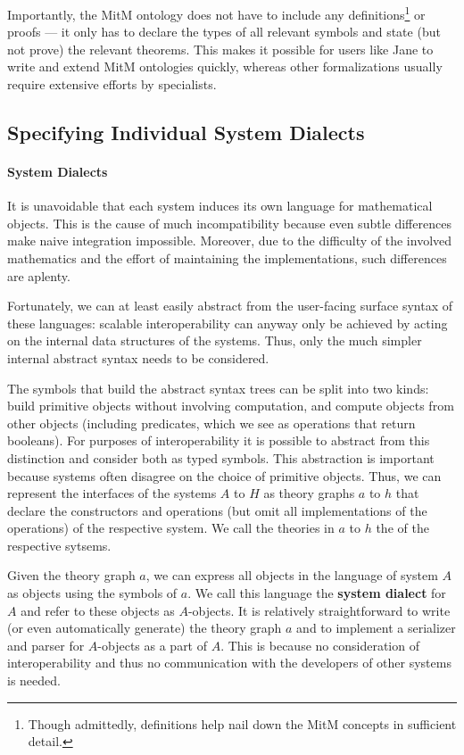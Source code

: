 Importantly, the MitM ontology does not have to include any definitions\footnote{Though admittedly, definitions help nail down the MitM concepts in sufficient detail. } or proofs --- it only has to declare the types of all relevant symbols and state (but not prove) the relevant theorems.
This makes it possible for users like Jane to write and extend MitM ontologies quickly, whereas other formalizations usually require extensive efforts by specialists.

\subsection{Specifying Individual System Dialects}\label{sec:mitm:dialect}

\paragraph{System Dialects}
It is unavoidable that each system induces its own language for mathematical objects.
This is the cause of much incompatibility because even subtle differences make naive integration impossible.
Moreover, due to the difficulty of the involved mathematics and the effort of maintaining the implementations, such differences are aplenty.

Fortunately, we can at least easily abstract from the user-facing surface syntax of these languages:
scalable interoperability can anyway only be achieved by acting on the internal data structures of the systems.
Thus, only the much simpler internal abstract syntax needs to be considered.

The symbols that build the abstract syntax trees can be split into two kinds:  build primitive objects without involving computation, and 
compute objects from other objects (including predicates, which we see as operations that return booleans).
For purposes of interoperability it is possible to abstract from this distinction and consider both as typed symbols.
This abstraction is important because systems often disagree on the choice of primitive objects.
Thus, we can represent the interfaces of the systems $A$ to $H$ as \OMMT theory graphs $a$ to $h$ that declare the constructors and operations (but omit all implementations of the operations) of the respective system.
We call the theories in $a$ to $h$ the  of the respective sytsems. 

Given the theory graph $a$, we can express all objects in the language of system $A$ as \OMMT objects using the symbols of $a$.
We call this language the \textbf{\OMMT system dialect} for $A$ and refer to these objects as $A$-objects.
It is relatively straightforward to write (or even automatically generate) the theory graph $a$ and to implement a serializer and parser for $A$-objects as a part of $A$.
This is because no consideration of interoperability and thus no communication with the developers of other systems is needed.

